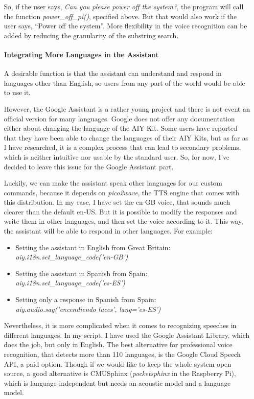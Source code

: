 So, if the user says, \textit{Can you please power off the system?}, the program will call the function \textit{power\_off\_pi()},
specified above. But that would also work if the user says, “Power off the system”. More flexibility in the voice recognition can
be added by reducing the granularity of the substring search.

\paragraph{Integrating More Languages in the Assistant}
A desirable function is that the assistant can understand and respond in languages other than English, so users from any part of
the world would be able to use it.

However, the Google Assistant is a rather young project and there is not event an official version for many languages. Google does
not offer any documentation either about changing the language of the AIY Kit. Some users have reported that they have been able
to change the languages of their AIY Kits, but as far as I have researched, it is a complex process that can lead to secondary
problems, which is neither intuitive nor usable by the standard user. So, for now, I've decided to leave this issue for the Google
Assistant part.

Luckily, we can make the assistant speak other languages for our custom commands, because it depends on \textit{pico2wave}, the TTS
engine that comes with this distribution. In my case, I have set the en-GB voice, that sounds much clearer than the default en-US.
But it is possible to modify the responses and write them in other languages, and then set the voice according to it. This way,
the assistant will be able to respond in other languages. For example:
\begin{itemize}
	\item Setting the assistant in English from Great Britain:\\
		\textit{aiy.i18n.set\_language\_code('en-GB')}
	\item Setting the assistant in Spanish from Spain: \\
		\textit{aiy.i18n.set\_language\_code('es-ES')}
	\item Setting only a response in Spanish from Spain: \\
		\textit{aiy.audio.say('encendiendo luces', lang='es-ES')}
\end{itemize}

Nevertheless, it is more complicated when it comes to recognizing speeches in different languages. In my script, I have used the
Google Assistant Library, which does the job, but only in English. The best alternative for professional voice recognition, that
detects more than 110 languages, is the Google Cloud Speech API, a paid option. Though if we would like to keep the whole system
open source, a good alternative is CMUSphinx\cite{cmusphinxWiki} (\textit{pocketsphinx} in the Raspberry Pi), which is
language-independent but needs an acoustic model and a language model.


